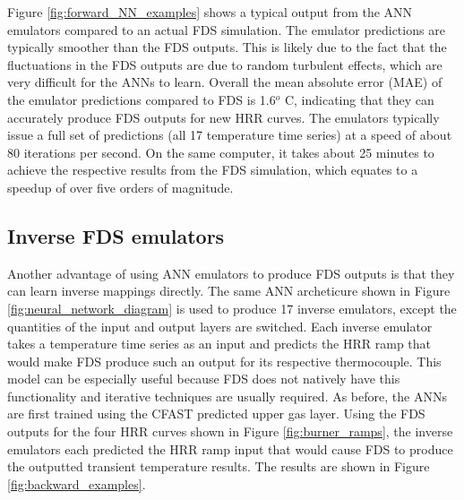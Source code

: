 \documentclass{article}
\begin{document}
Figure \protect\ref{fig:forward_NN_examples} shows a typical output from the ANN emulators compared to an actual FDS simulation. The emulator predictions are typically smoother than the FDS outputs. This is likely due to the fact that the fluctuations in the FDS outputs are due to random turbulent effects, which are very difficult for the ANNs to learn. Overall the mean absolute error (MAE) of the emulator predictions compared to FDS is 1.6$^o$ C, indicating that they can accurately produce FDS outputs for new HRR curves. The emulators typically issue a full set of predictions (all 17 temperature time series) at a speed of about 80 iterations per second. On the same computer, it takes about 25 minutes to achieve the respective results from the FDS simulation, which equates to a speedup of over five orders of magnitude. 


\subsection{Inverse FDS emulators}
Another advantage of using ANN emulators to produce FDS outputs is that they can learn inverse mappings directly. The same ANN archeticure shown in Figure \ref{fig:neural_network_diagram} is used to produce 17 inverse emulators, except the quantities of the input and output layers are switched.  Each inverse emulator takes a temperature time series as an input and predicts the HRR ramp that would make FDS produce such an output for its respective thermocouple. This model can be especially useful because FDS does not natively have this functionality and iterative techniques are usually required. As before, the ANNs are first trained using the CFAST predicted upper gas layer. Using the FDS outputs for the four HRR curves shown in Figure \ref{fig:burner_ramps}, the inverse emulators each predicted the HRR ramp input that would cause FDS to produce the outputted transient temperature results. The results are shown in Figure \ref{fig:backward_examples}.
\end{document}
